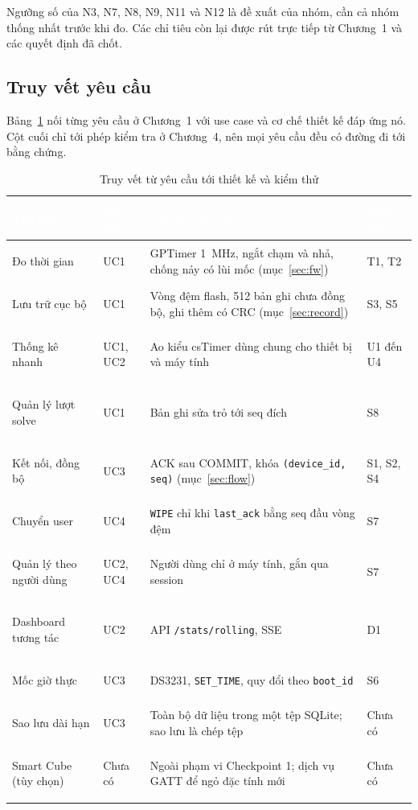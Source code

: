 Ngưỡng số của N3, N7, N8, N9, N11 và N12 là đề xuất của nhóm, cần cả nhóm thống nhất trước khi đo. Các chỉ tiêu còn lại được rút trực tiếp từ Chương~1 và các quyết định đã chốt.

\subsection{Truy vết yêu cầu}
Bảng~\ref{tab:trace} nối từng yêu cầu ở Chương~1 với use case và cơ chế thiết kế đáp ứng nó. Cột cuối chỉ tới phép kiểm tra ở Chương~4, nên mọi yêu cầu đều có đường đi tới bằng chứng.

\begin{table}[H]
    \centering
    \small
    \renewcommand{\arraystretch}{1.3}
    \caption{Truy vết từ yêu cầu tới thiết kế và kiểm thử}
    \label{tab:trace}
    \begin{tabular}{>{\bfseries\raggedright\arraybackslash}m{3.2cm} >{\raggedright\arraybackslash}m{1.6cm} >{\raggedright\arraybackslash}m{6.6cm} >{\raggedright\arraybackslash}m{2.2cm}}
        \toprule
        \rowcolor{haitayblue}
        \textcolor{white}{Yêu cầu} & \textcolor{white}{Use case} & \textcolor{white}{Cơ chế thiết kế} & \textcolor{white}{Kiểm tra} \\
        \midrule
        \rowcolor{haitayblue!8}
        Đo thời gian & UC1 & GPTimer 1~MHz, ngắt chạm và nhả, chống nảy có lùi mốc (mục~\ref{sec:fw}) & T1, T2 \\
        Lưu trữ cục bộ & UC1 & Vòng đệm flash, 512 bản ghi chưa đồng bộ, ghi thêm có CRC (mục~\ref{sec:record}) & S3, S5 \\
        \rowcolor{haitayblue!8}
        Thống kê nhanh & UC1, UC2 & Ao kiểu csTimer dùng chung cho thiết bị và máy tính & U1 đến U4 \\
        Quản lý lượt solve & UC1 & Bản ghi sửa trỏ tới seq đích & S8 \\
        \rowcolor{haitayblue!8}
        Kết nối, đồng bộ & UC3 & ACK sau COMMIT, khóa \texttt{(device\_id, seq)} (mục~\ref{sec:flow}) & S1, S2, S4 \\
        Chuyển user & UC4 & \texttt{WIPE} chỉ khi \texttt{last\_ack} bằng seq đầu vòng đệm & S7 \\
        \rowcolor{haitayblue!8}
        Quản lý theo người dùng & UC2, UC4 & Người dùng chỉ ở máy tính, gắn qua session & S7 \\
        Dashboard tương tác & UC2 & API \texttt{/stats/rolling}, SSE & D1 \\
        \rowcolor{haitayblue!8}
        Mốc giờ thực & UC3 & DS3231, \texttt{SET\_TIME}, quy đổi theo \texttt{boot\_id} & S6 \\
        Sao lưu dài hạn & UC3 & Toàn bộ dữ liệu trong một tệp SQLite; sao lưu là chép tệp & Chưa có \\
        \rowcolor{haitayblue!8}
        Smart Cube (tùy chọn) & Chưa có & Ngoài phạm vi Checkpoint 1; dịch vụ GATT để ngỏ đặc tính mới & Chưa có \\
        \bottomrule
    \end{tabular}
\end{table}

